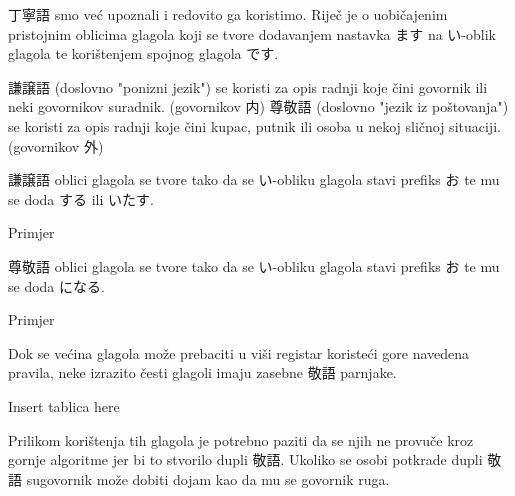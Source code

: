 	
	丁寧語 smo već upoznali i redovito ga koristimo. Riječ je o uobičajenim pristojnim oblicima glagola koji se tvore dodavanjem nastavka ます na い-oblik glagola te korištenjem spojnog glagola です.
	
	
	謙譲語 (doslovno "ponizni jezik") se koristi za opis radnji koje čini govornik ili neki govornikov suradnik. (govornikov 内)
	尊敬語 (doslovno "jezik iz poštovanja") se koristi za opis radnji koje čini kupac, putnik ili osoba u nekoj sličnoj situaciji. (govornikov 外)
	
	謙譲語 oblici glagola se tvore tako da se い-obliku glagola stavi prefiks お te mu se doda する ili いたす.
	
	Primjer
	
	尊敬語 oblici glagola se tvore tako da se い-obliku glagola stavi prefiks お te mu se doda になる.
	
	Primjer
	

	Dok se većina glagola može prebaciti u viši registar koristeći gore navedena pravila, neke izrazito česti glagoli imaju zasebne 敬語 parnjake.
	
	Insert tablica here
	
	Prilikom korištenja tih glagola je potrebno paziti da se njih ne provuče kroz gornje algoritme jer bi to stvorilo dupli 敬語. Ukoliko se osobi potkrade dupli 敬語 sugovornik može dobiti dojam kao da mu se govornik ruga.
	
